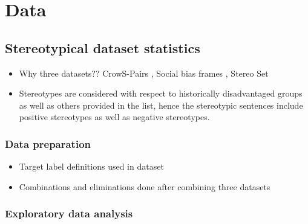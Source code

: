 \chapter{Data}
\section{Stereotypical dataset statistics}

\begin{itemize}
    \item Why three datasets?? CrowS-Pairs \cite{nangia2020crows}, Social bias frames \cite{sap2019social}, Stereo Set \cite{nadeem2020stereoset}
    \item Stereotypes are considered with respect to historically disadvantaged groups as well as others provided in the list, hence the stereotypic sentences include positive stereotypes as well as negative stereotypes.
\end{itemize}
\subsection{Data preparation}
    \begin{itemize}
        \item Target label definitions used in dataset
        \item Combinations and eliminations done after combining three datasets
    \end{itemize}
\subsection{Exploratory data analysis}